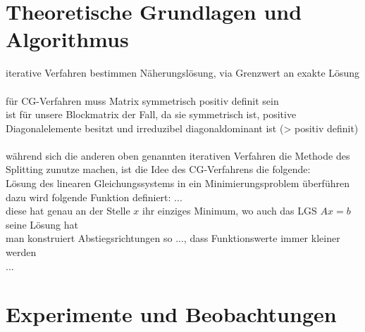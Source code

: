 \documentclass{scrartcl}
\begin{document}
\section{Theoretische Grundlagen und Algorithmus}
iterative Verfahren bestimmen Näherungslösung, via Grenzwert an exakte Lösung \\
\\
für CG-Verfahren muss Matrix symmetrisch positiv definit sein \\
ist für unsere Blockmatrix der Fall, da sie symmetrisch ist, positive Diagonalelemente besitzt und irreduzibel diagonaldominant ist (> positiv definit) \\
\\
während sich die anderen oben genannten iterativen Verfahren die Methode des Splitting zunutze machen, ist die Idee des CG-Verfahrens die folgende: \\
Lösung des linearen Gleichungssystems in ein Minimierungsproblem überführen \\
dazu wird folgende Funktion definiert: ... \\
diese hat genau an der Stelle $x$ ihr einziges Minimum, wo auch das LGS $Ax=b$ seine Lösung hat \\
man konstruiert Abstiegsrichtungen so ..., dass Funktionswerte immer kleiner werden \\
...

\pagebreak
\section{Experimente und Beobachtungen}
\end{document}
